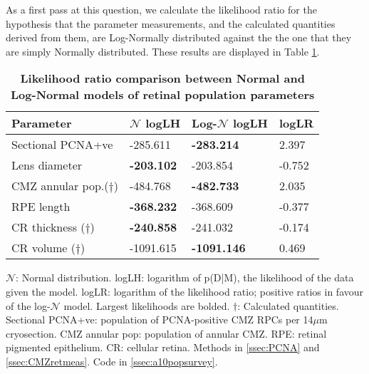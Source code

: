 As a first pass at this question, we calculate the likelihood ratio for the hypothesis that the parameter measurements, and the calculated quantities derived from them, are Log-Normally distributed against the the one that they are simply Normally distributed. These results are displayed in Table \ref{PLHRtable}.

\begin{table}[!ht]
    \centering
    \caption{
    {\bf Likelihood ratio comparison between Normal and Log-Normal models of retinal population parameters}}
    \begin{tabular}{|l|l|l|l|}
    \hline
    {\bf Parameter} & {\bf $\mathcal{N}$ logLH} & {\bf Log-$\mathcal{N}$ logLH} & {\bf logLR} \\ \hline
    Sectional PCNA+ve & -285.611 & {\bf -283.214} & 2.397\\ \hline
    Lens diameter & {\bf -203.102} & -203.854 & -0.752\\ \hline
    CMZ annular pop.($\dagger$)  & -484.768 & {\bf -482.733} & 2.035\\ \hline
    RPE length & {\bf -368.232} & -368.609 & -0.377\\ \hline
    CR thickness ($\dagger$) & {\bf -240.858} & -241.032 & -0.174\\ \hline
    CR volume ($\dagger$) & -1091.615 & {\bf -1091.146} & 0.469\\ \hline
    \end{tabular}
    \begin{flushleft} $\mathcal{N}$: Normal distribution. logLH: logarithm of p(D|M), the likelihood of the data given the model. logLR: logarithm of the likelihood ratio; positive ratios in favour of the log-$\mathcal{N}$ model. Largest likelihoods are bolded. $\dagger$: Calculated quantities. Sectional PCNA+ve: population of PCNA-positive CMZ RPCs per 14$\mu$m cryosection. CMZ annular pop: population of annular CMZ. RPE: retinal pigmented epithelium. CR: cellular retina.
    Methods in \autoref{ssec:PCNA} and \autoref{ssec:CMZretmeas}.
    Code in \autoref{ssec:a10popsurvey}.
    \end{flushleft}
    \label{PLHRtable}
\end{table}

